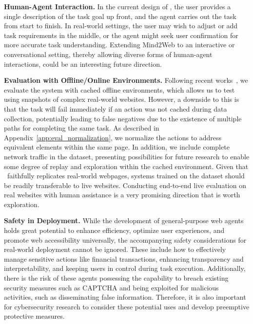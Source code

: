 \noindent\textbf{Human-Agent Interaction.}
In the current design of \mind, the user provides a single description of the task goal up front, and the agent carries out the task from start to finish.
In real-world settings, the user may wish to adjust or add task requirements in the middle, or the agent might seek user confirmation for more accurate task understanding.
Extending Mind2Web to an interactive or conversational setting, thereby allowing diverse forms of human-agent interactions, could be an interesting future direction.

\noindent\textbf{Evaluation with Offline/Online Environments.}
Following recent works~\cite{sunMETAGUIMultimodalConversational2022, Burns2022ADF}, we evaluate the system with cached offline environments, which allows us to test using snapshots of complex real-world websites.
However, a downside to this is that the task will fail immediately if an action was not cached during data collection, potentially leading to false negatives due to the existence of multiple paths for completing the same task.
As described in Appendix~\ref{app:eval_normalization}, we normalize the actions to address equivalent elements within the same page. 
In addition, we include complete network traffic in the dataset, presenting possibilities for future research to enable some degree of replay and exploration within the cached environment.
Given that \mind\ faithfully replicates real-world webpages, systems trained on the dataset should be readily transferable to live websites. 
Conducting end-to-end live evaluation on real websites with human assistance is a very promising direction that is worth exploration.

\noindent\textbf{Safety in Deployment.}
While the development of general-purpose web agents holds great potential to enhance efficiency, optimize user experiences, and promote web accessibility universally, the accompanying safety considerations for real-world deployment cannot be ignored.
These include how to effectively manage sensitive actions like financial transactions, enhancing transparency and interpretability, and keeping users in control during task execution.
Additionally, there is the risk of these agents possessing the capability to breach existing security measures such as CAPTCHA and being exploited for malicious activities, such as disseminating false information.
Therefore, it is also important for cybersecurity research to consider these potential uses and develop preemptive protective measures.



